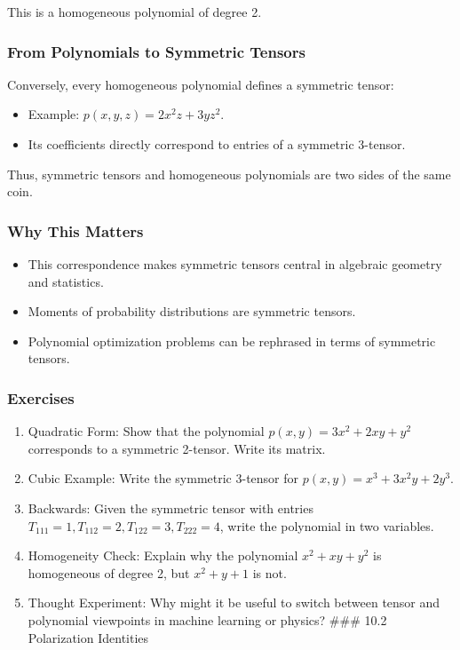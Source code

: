 \documentclass[
  letterpaper,
  DIV=11,
  numbers=noendperiod]{scrreprt}
\providecommand{\tightlist}{%
  \setlength{\itemsep}{0pt}\setlength{\parskip}{0pt}}
\begin{document}
This is a homogeneous polynomial of degree 2.

\subsubsection{From Polynomials to Symmetric
Tensors}\label{from-polynomials-to-symmetric-tensors}

Conversely, every homogeneous polynomial defines a symmetric tensor:

\begin{itemize}
\tightlist
\item
  Example: \(p(x,y,z) = 2x^2z + 3yz^2\).
\item
  Its coefficients directly correspond to entries of a symmetric
  3-tensor.
\end{itemize}

Thus, symmetric tensors and homogeneous polynomials are two sides of the
same coin.

\subsubsection{Why This Matters}\label{why-this-matters-23}

\begin{itemize}
\tightlist
\item
  This correspondence makes symmetric tensors central in algebraic
  geometry and statistics.
\item
  Moments of probability distributions are symmetric tensors.
\item
  Polynomial optimization problems can be rephrased in terms of
  symmetric tensors.
\end{itemize}

\subsubsection{Exercises}\label{exercises-35}

\begin{enumerate}
\def\labelenumi{\arabic{enumi}.}
\item
  Quadratic Form: Show that the polynomial \(p(x,y) = 3x^2 + 2xy + y^2\)
  corresponds to a symmetric 2-tensor. Write its matrix.
\item
  Cubic Example: Write the symmetric 3-tensor for
  \(p(x,y) = x^3 + 3x^2y + 2y^3\).
\item
  Backwards: Given the symmetric tensor with entries
  \(T_{111}=1, T_{112}=2, T_{122}=3, T_{222}=4\), write the polynomial
  in two variables.
\item
  Homogeneity Check: Explain why the polynomial \(x^2 + xy + y^2\) is
  homogeneous of degree 2, but \(x^2 + y + 1\) is not.
\item
  Thought Experiment: Why might it be useful to switch between tensor
  and polynomial viewpoints in machine learning or physics? \#\#\# 10.2
  Polarization Identities
\end{enumerate}
\end{document}
